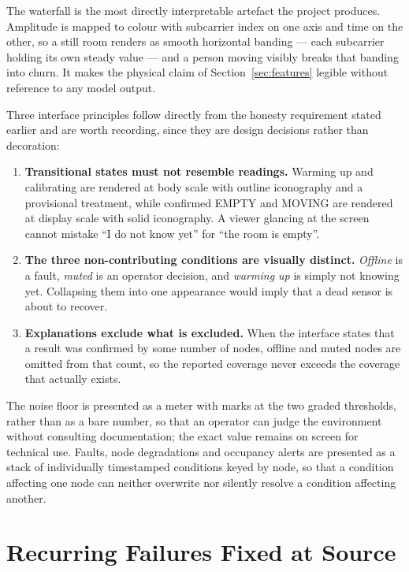 \documentclass[11pt,a4paper]{article}
\begin{document}
The waterfall is the most directly interpretable artefact the project
produces. Amplitude is mapped to colour with subcarrier index on one axis and
time on the other, so a still room renders as smooth horizontal banding --- each
subcarrier holding its own steady value --- and a person moving visibly breaks
that banding into churn. It makes the physical claim of
Section~\ref{sec:features} legible without reference to any model output.

Three interface principles follow directly from the honesty requirement stated
earlier and are worth recording, since they are design decisions rather than
decoration:

\begin{enumerate}[leftmargin=1.6em, itemsep=3pt]
  \item \textbf{Transitional states must not resemble readings.} Warming up and
        calibrating are rendered at body scale with outline iconography and a
        provisional treatment, while confirmed EMPTY and MOVING are rendered at
        display scale with solid iconography. A viewer glancing at the screen
        cannot mistake ``I do not know yet'' for ``the room is empty''.
  \item \textbf{The three non-contributing conditions are visually distinct.}
        \emph{Offline} is a fault, \emph{muted} is an operator decision, and
        \emph{warming up} is simply not knowing yet. Collapsing them into one
        appearance would imply that a dead sensor is about to recover.
  \item \textbf{Explanations exclude what is excluded.} When the interface
        states that a result was confirmed by some number of nodes, offline and
        muted nodes are omitted from that count, so the reported coverage never
        exceeds the coverage that actually exists.
\end{enumerate}

\noindent
The noise floor is presented as a meter with marks at the two graded
thresholds, rather than as a bare number, so that an operator can judge the
environment without consulting documentation; the exact value remains on screen
for technical use. Faults, node degradations and occupancy alerts are presented
as a stack of individually timestamped conditions keyed by node, so that a
condition affecting one node can neither overwrite nor silently resolve a
condition affecting another.

\section{Recurring Failures Fixed at Source}
\label{sec:recurring}
\end{document}
